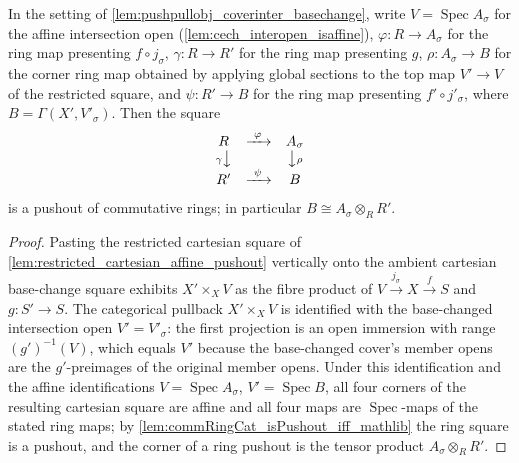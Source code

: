 \begin{lemma}
  \label{lem:coverinter_ring_pushout}
  In the setting of \cref{lem:pushpullobj_coverinter_basechange}, write
  \(V = \operatorname{Spec} A_\sigma\) for the affine intersection open
  (\cref{lem:cech_interopen_isaffine}), \(\varphi : R \to A_\sigma\) for the ring map
  presenting \(f \circ j_\sigma\), \(\gamma : R \to R'\) for the ring map presenting \(g\),
  \(\rho : A_\sigma \to B\) for the corner ring map obtained by applying global sections to
  the top map \(V' \to V\) of the restricted square, and \(\psi : R' \to B\) for the ring map
  presenting \(f' \circ j'_\sigma\), where \(B = \Gamma(X', V'_\sigma)\). Then the square
  \[
    \begin{array}{ccc}
      R & \xrightarrow{\ \varphi\ } & A_\sigma\\
      {\scriptstyle \gamma}\big\downarrow & & \big\downarrow{\scriptstyle \rho}\\
      R' & \xrightarrow{\ \psi\ } & B
    \end{array}
  \]
  is a pushout of commutative rings; in particular \(B \cong A_\sigma \otimes_R R'\).
\end{lemma}
\begin{proof}
  \leanok
  Pasting the restricted cartesian square of
  \cref{lem:restricted_cartesian_affine_pushout} vertically onto the ambient cartesian
  base-change square exhibits \(X' \times_X V\) as the fibre product of
  \(V \xrightarrow{j_\sigma} X \xrightarrow{f} S\) and \(g : S' \to S\). The categorical
  pullback \(X' \times_X V\) is identified with the base-changed intersection open
  \(V' = V'_\sigma\): the first projection is an open immersion with range
  \((g')^{-1}(V)\), which equals \(V'\) because the base-changed cover's member opens are
  the \(g'\)-preimages of the original member opens. Under this identification and the
  affine identifications \(V = \operatorname{Spec} A_\sigma\),
  \(V' = \operatorname{Spec} B\), all four corners of the resulting cartesian square are
  affine and all four maps are \(\operatorname{Spec}\)-maps of the stated ring maps; by
  \cref{lem:commRingCat_isPushout_iff_mathlib} the ring square is a pushout, and the corner
  of a ring pushout is the tensor product \(A_\sigma \otimes_R R'\).
\end{proof}

